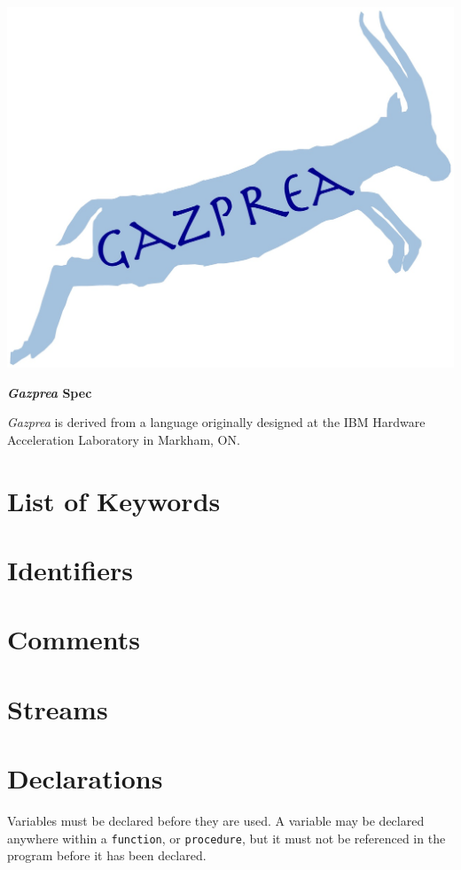 \documentclass{article}
\begin{document}
	\includegraphics[width=.5\textwidth]{static/GazpreaLogo.png}

	\ifpdf
		\LARGE
		\textbf{\textit{Gazprea} Spec}
		\normalsize
	\fi

\ifpdf
  \hspace{.7in}
\fi

\textit{Gazprea} is derived from a language originally designed at the IBM Hardware Acceleration
Laboratory in Markham, ON.

\section{List of Keywords}


\section{Identifiers}
\label{sec:identifiers}


\section{Comments}
\label{sec:comments}



\section{Streams}
\label{sec:streams}


\section{Declarations}\label{sec:declaration}

	Variables must be declared before they are used. A variable may be declared anywhere within a \texttt{function}, or
	\texttt{procedure}, but it must not be referenced in the program before it has been declared.
\end{document}
